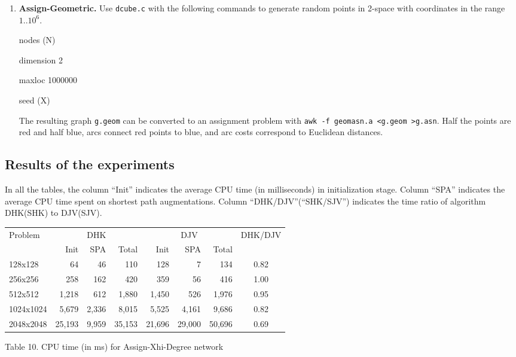 \begin{enumerate}
\item {\bf Assign-Geometric.}  Use {\tt dcube.c} with the following
commands to generate random points in 2-space with coordinates in the
range $1..10^6$. 

nodes  (N)

dimension 2

maxloc  1000000

seed   (X) 

The resulting graph {\tt g.geom} can be converted to an assignment
problem with {\tt awk -f geomasn.a <g.geom >g.asn}.  Half the points
are red and half blue, arcs connect red points to blue, and arc costs
correspond to Euclidean distances. 
\end{enumerate}

\subsection{Results of the experiments}

In all the tables, the column ``Init''
indicates the average CPU time (in milliseconds) in 
initialization stage. Column ``SPA'' indicates
the average CPU time spent on shortest path augmentations. 
Column ``DHK/DJV''(``SHK/SJV'') indicates the time ratio of 
algorithm DHK(SHK) to DJV(SJV).

\vskip 5pt
{\small
\begin{tabular}{|l|rrr|rrr|c|} \hline
 Problem & \multicolumn{3}{c|}{DHK}& \multicolumn{3}{c|}{DJV}&\multicolumn{1}{c|}{DHK/DJV}\\
&Init &SPA &Total &Init &SPA &Total&\\ \hline
128x128&  64& 46& 110&             128& 7& 134& 0.82\\ 
256x256&  258& 162& 420&           359& 56& 416& 1.00\\ 
512x512&  1,218& 612& 1,880&       1,450& 526& 1,976& 0.95\\ 
1024x1024&  5,679& 2,336& 8,015&   5,525& 4,161& 9,686& 0.82\\ 
2048x2048&  25,193& 9,959& 35,153&  21,696& 29,000& 50,696& 
0.69\\ \hline
\end{tabular}
}

\vskip 2pt
{Table 10. CPU time (in ms) for Assign-Xhi-Degree network}
\vskip 5pt

